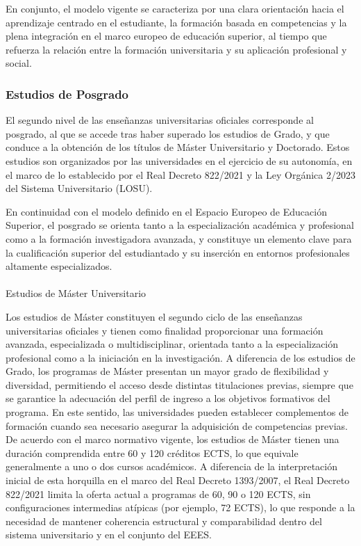 \documentclass[
  11pt,
  a4paper,
  twoside]{scrreprt}
\makeatletter
\let\oldparagraph\paragraph
\renewcommand{\paragraph}{
    \@ifstar
      \xxxParagraphStar
      \xxxParagraphNoStar
  }
\newcommand{\xxxParagraphStar}[1]{\oldparagraph*{#1}\mbox{}}
\newcommand{\xxxParagraphNoStar}[1]{\oldparagraph{#1}\mbox{}}
\makeatother
\begin{document}
En conjunto, el modelo vigente se caracteriza por una clara orientación
hacia el aprendizaje centrado en el estudiante, la formación basada en
competencias y la plena integración en el marco europeo de educación
superior, al tiempo que refuerza la relación entre la formación
universitaria y su aplicación profesional y social.

\subsubsection{Estudios de Posgrado}\label{estudios-de-posgrado}

El segundo nivel de las enseñanzas universitarias oficiales corresponde
al posgrado, al que se accede tras haber superado los estudios de Grado,
y que conduce a la obtención de los títulos de Máster Universitario y
Doctorado. Estos estudios son organizados por las universidades en el
ejercicio de su autonomía, en el marco de lo establecido por el Real
Decreto 822/2021 y la Ley Orgánica 2/2023 del Sistema Universitario
(LOSU).

En continuidad con el modelo definido en el Espacio Europeo de Educación
Superior, el posgrado se orienta tanto a la especialización académica y
profesional como a la formación investigadora avanzada, y constituye un
elemento clave para la cualificación superior del estudiantado y su
inserción en entornos profesionales altamente especializados.

\paragraph{Estudios de Máster
Universitario}\label{estudios-de-muxe1ster-universitario}

Los estudios de Máster constituyen el segundo ciclo de las enseñanzas
universitarias oficiales y tienen como finalidad proporcionar una
formación avanzada, especializada o multidisciplinar, orientada tanto a
la especialización profesional como a la iniciación en la investigación.
A diferencia de los estudios de Grado, los programas de Máster presentan
un mayor grado de flexibilidad y diversidad, permitiendo el acceso desde
distintas titulaciones previas, siempre que se garantice la adecuación
del perfil de ingreso a los objetivos formativos del programa. En este
sentido, las universidades pueden establecer complementos de formación
cuando sea necesario asegurar la adquisición de competencias previas. De
acuerdo con el marco normativo vigente, los estudios de Máster tienen
una duración comprendida entre 60 y 120 créditos ECTS, lo que equivale
generalmente a uno o dos cursos académicos. A diferencia de la
interpretación inicial de esta horquilla en el marco del Real Decreto
1393/2007, el Real Decreto 822/2021 limita la oferta actual a programas
de 60, 90 o 120 ECTS, sin configuraciones intermedias atípicas (por
ejemplo, 72 ECTS), lo que responde a la necesidad de mantener coherencia
estructural y comparabilidad dentro del sistema universitario y en el
conjunto del EEES.
\end{document}
